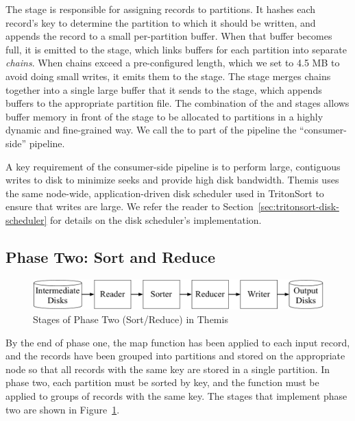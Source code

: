 The \Demuxbf stage is responsible for assigning records to partitions.  It
hashes each record's key to determine the partition to which it should be
written, and appends the record to a small per-partition buffer.  When that
buffer becomes full, it is emitted to the \Chainerbf stage, which links buffers
for each partition into separate \emph{chains}.  When chains exceed a
pre-configured length, which we set to 4.5 MB to avoid doing small writes, it
emits them to the \Coalescerbf stage.  The \Coalescerbf stage merges chains
together into a single large buffer that it sends to the \Writerbf stage,
which appends buffers to the appropriate partition file. The combination of the
\Chainer and \Coalescer stages allows buffer memory in front of the \Writer
stage to be allocated to partitions in a highly dynamic and fine-grained way.
We call the \Receiver to \Writer part of the pipeline the ``consumer-side''
pipeline.

A key requirement of the consumer-side pipeline is to perform large, contiguous
writes to disk to minimize seeks and provide high disk bandwidth.  Themis uses
the same node-wide, application-driven disk scheduler used in TritonSort to
ensure that writes are large. We refer the reader to
Section~\ref{sec:tritonsort-disk-scheduler} for details on the disk scheduler's
implementation.

\subsection{Phase Two: Sort and Reduce}
\label{sec:phase_two}
\label{sec:reduce}

\begin{figure}[h]
\centering
\includegraphics[width=\columnwidth]{themis/figures/phase_two.pdf}
\caption{\label{themis:fig:phase_two} Stages of Phase Two (Sort/Reduce) in Themis}
\end{figure}

By the end of phase one, the map function has been applied to each input
record, and the records have been grouped into partitions and stored on the
appropriate node so that all records with the same key are stored in a single
partition.  In phase two, each partition must be sorted by key, and the \reduce
function must be applied to groups of records with the same key.  The stages
that implement phase two are shown in Figure~\ref{themis:fig:phase_two}.

